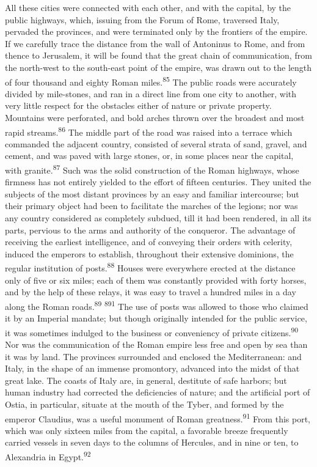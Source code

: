 All these cities were connected with each other, and with the
capital, by the public highways, which, issuing from the Forum of
Rome, traversed Italy, pervaded the provinces, and were
terminated only by the frontiers of the empire. If we carefully
trace the distance from the wall of Antoninus to Rome, and from
thence to Jerusalem, it will be found that the great chain of
communication, from the north-west to the south-east point of the
empire, was drawn out to the length of four thousand and eighty
Roman miles.\textsuperscript{85} The public roads were accurately divided by
mile-stones, and ran in a direct line from one city to another,
with very little respect for the obstacles either of nature or
private property. Mountains were perforated, and bold arches
thrown over the broadest and most rapid streams.\textsuperscript{86} The middle
part of the road was raised into a terrace which commanded the
adjacent country, consisted of several strata of sand, gravel,
and cement, and was paved with large stones, or, in some places
near the capital, with granite.\textsuperscript{87} Such was the solid
construction of the Roman highways, whose firmness has not
entirely yielded to the effort of fifteen centuries. They united
the subjects of the most distant provinces by an easy and
familiar intercourse; but their primary object had been to
facilitate the marches of the legions; nor was any country
considered as completely subdued, till it had been rendered, in
all its parts, pervious to the arms and authority of the
conqueror. The advantage of receiving the earliest intelligence,
and of conveying their orders with celerity, induced the emperors
to establish, throughout their extensive dominions, the regular
institution of posts.\textsuperscript{88} Houses were everywhere erected at the
distance only of five or six miles; each of them was constantly
provided with forty horses, and by the help of these relays, it
was easy to travel a hundred miles in a day along the Roman
roads.\textsuperscript{89} \textsuperscript{891} The use of posts was allowed to those who claimed
it by an Imperial mandate; but though originally intended for the
public service, it was sometimes indulged to the business or
conveniency of private citizens.\textsuperscript{90} Nor was the communication of
the Roman empire less free and open by sea than it was by land.
The provinces surrounded and enclosed the Mediterranean: and
Italy, in the shape of an immense promontory, advanced into the
midst of that great lake. The coasts of Italy are, in general,
destitute of safe harbors; but human industry had corrected the
deficiencies of nature; and the artificial port of Ostia, in
particular, situate at the mouth of the Tyber, and formed by the
emperor Claudius, was a useful monument of Roman greatness.\textsuperscript{91}
From this port, which was only sixteen miles from the capital, a
favorable breeze frequently carried vessels in seven days to the
columns of Hercules, and in nine or ten, to Alexandria in Egypt.\textsuperscript{92}

